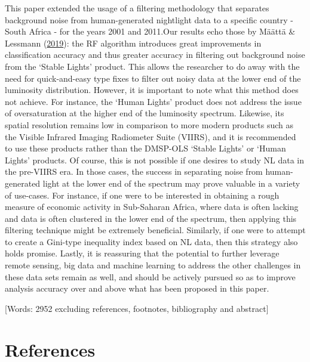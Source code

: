 \documentclass[11pt,preprint, authoryear]{elsarticle}
\numberwithin{equation}{section}
\numberwithin{figure}{section}
\numberwithin{table}{section}
\begin{document}
This paper extended the usage of a filtering methodology that separates
background noise from human-generated nightlight data to a specific
country - South Africa - for the years 2001 and 2011.Our results echo
those by Määttä \& Lessmann (\protect\hyperlink{ref-maatta}{2019}): the
RF algorithm introduces great improvements in classification accuracy
and thus greater accuracy in filtering out background noise from the
`Stable Lights' product. This allows the researcher to do away with the
need for quick-and-easy type fixes to filter out noisy data at the lower
end of the luminosity distribution. However, it is important to note
what this method does not achieve. For instance, the `Human Lights'
product does not address the issue of oversaturation at the higher end
of the luminosity spectrum. Likewise, its spatial resolution remains low
in comparison to more modern products such as the Visible Infrared
Imaging Radiometer Suite (VIIRS), and it is recommended to use these
products rather than the DMSP-OLS `Stable Lights' or `Human Lights'
products. Of course, this is not possible if one desires to study NL
data in the pre-VIIRS era. In those cases, the success in separating
noise from human-generated light at the lower end of the spectrum may
prove valuable in a variety of use-cases. For instance, if one were to
be interested in obtaining a rough measure of economic activity in
Sub-Saharan Africa, where data is often lacking and data is often
clustered in the lower end of the spectrum, then applying this filtering
technique might be extremely beneficial. Similarly, if one were to
attempt to create a Gini-type inequality index based on NL data, then
this strategy also holds promise. Lastly, it is reassuring that the
potential to further leverage remote sensing, big data and machine
learning to address the other challenges in these data sets remain as
well, and should be actively pursued so as to improve analysis accuracy
over and above what has been proposed in this paper.

{[}Words: 2952 excluding references, footnotes, bibliography and
abstract{]}

\newpage

\hypertarget{references}{%
\section*{References}\label{references}}
\end{document}
